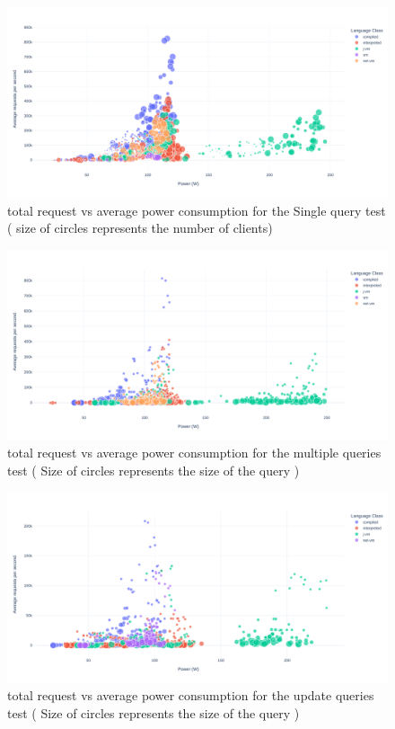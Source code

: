 \begin{figure}[bht]
    \centering
    \includegraphics[width=
        \columnwidth]{imgs/power_requests_db}
    \caption{total request vs average power consumption for the Single query test ( size of circles represents the number of clients)}
    \label{fig:power_requests_db}
\end{figure}
\begin{figure}[bht]
    \centering
    \includegraphics[width=
        \columnwidth]{imgs/power_requests_query}
    \caption{total request vs average power consumption for the multiple queries test ( Size of circles represents the size of the query )}
    \label{fig:power_requests_query}
\end{figure}
\begin{figure}[bht]
    \centering
    \includegraphics[width=
        \columnwidth]{imgs/power_requests_update}
    \caption{total request vs average power consumption for the update queries test ( Size of circles represents the size of the query )}
    \label{fig:power_requests_update}
\end{figure}
